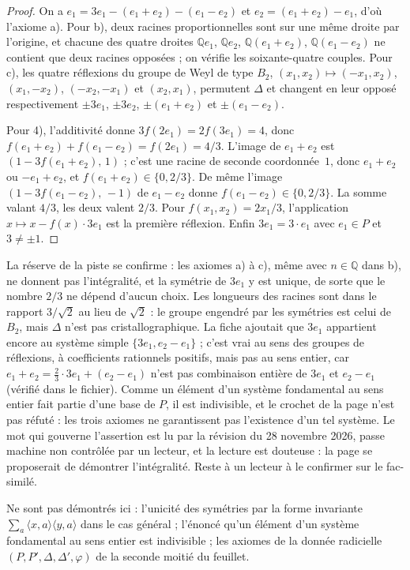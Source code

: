 \begin{proof}
On a $e_1 = 3e_1 - (e_1 + e_2) - (e_1 - e_2)$ et $e_2 = (e_1 + e_2) - e_1$, d'où l'axiome a). Pour b), deux racines proportionnelles sont sur une même droite par l'origine, et chacune des quatre droites $\mathbb Q e_1$, $\mathbb Q e_2$, $\mathbb Q(e_1 + e_2)$, $\mathbb Q(e_1 - e_2)$ ne contient que deux racines opposées ; on vérifie les soixante-quatre couples. Pour c), les quatre réflexions du groupe de Weyl de type $B_2$, $(x_1, x_2) \mapsto (-x_1, x_2)$, $(x_1, -x_2)$, $(-x_2, -x_1)$ et $(x_2, x_1)$, permutent $\Delta$ et changent en leur opposé respectivement $\pm 3e_1$, $\pm 3e_2$, $\pm(e_1 + e_2)$ et $\pm(e_1 - e_2)$.

Pour 4), l'additivité donne $3 f(2e_1) = 2 f(3e_1) = 4$, donc $f(e_1 + e_2) + f(e_1 - e_2) = f(2e_1) = 4/3$. L'image de $e_1 + e_2$ est $(1 - 3f(e_1 + e_2),\, 1)$ ; c'est une racine de seconde coordonnée~$1$, donc $e_1 + e_2$ ou $-e_1 + e_2$, et $f(e_1 + e_2) \in \{0, 2/3\}$. De même l'image $(1 - 3f(e_1 - e_2),\, -1)$ de $e_1 - e_2$ donne $f(e_1 - e_2) \in \{0, 2/3\}$. La somme valant $4/3$, les deux valent $2/3$. Pour $f(x_1, x_2) = 2x_1/3$, l'application $x \mapsto x - f(x) \cdot 3e_1$ est la première réflexion. Enfin $3e_1 = 3 \cdot e_1$ avec $e_1 \in P$ et $3 \neq \pm 1$.
\end{proof}

\begin{remarque}
La réserve de la piste se confirme : les axiomes a) à c), même avec $n \in \mathbb Q$ dans b), ne donnent pas l'intégralité, et la symétrie de $3e_1$ y est unique, de sorte que le nombre $2/3$ ne dépend d'aucun choix. Les longueurs des racines sont dans le rapport $3/\sqrt 2$ au lieu de $\sqrt 2$ : le groupe engendré par les symétries est celui de $B_2$, mais $\Delta$ n'est pas cristallographique. La fiche ajoutait que $3e_1$ appartient encore au système simple $\{3e_1, e_2 - e_1\}$ ; c'est vrai au sens des groupes de réflexions, à coefficients rationnels positifs, mais pas au sens entier, car $e_1 + e_2 = \frac23 \cdot 3e_1 + (e_2 - e_1)$ n'est pas combinaison entière de $3e_1$ et $e_2 - e_1$ (vérifié dans le fichier). Comme un élément d'un système fondamental au sens entier fait partie d'une base de $P$, il est indivisible, et le crochet de la page n'est pas réfuté : les trois axiomes ne garantissent pas l'existence d'un tel système. Le mot qui gouverne l'assertion est lu  par la révision du 28 novembre 2026, passe machine non contrôlée par un lecteur, et la lecture est douteuse : la page se proposerait de démontrer l'intégralité. Reste à un lecteur à le confirmer sur le fac-similé.
\end{remarque}

Ne sont pas démontrés ici : l'unicité des symétries par la forme invariante $\sum_{a} \langle x, a\rangle\langle y, a\rangle$ dans le cas général ; l'énoncé qu'un élément d'un système fondamental au sens entier est indivisible ; les axiomes de la donnée radicielle $(P, P', \Delta, \Delta', \varphi)$ de la seconde moitié du feuillet.
